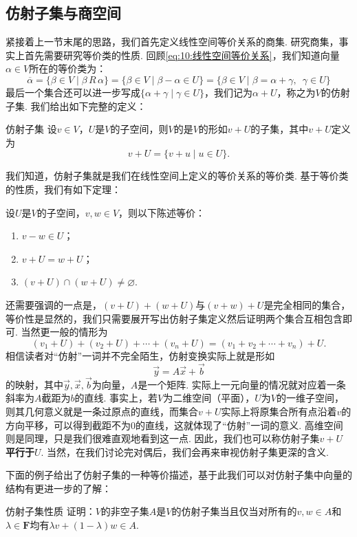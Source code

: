 \subsection{仿射子集与商空间}

紧接着上一节末尾的思路，我们首先定义线性空间等价关系的商集. 研究商集，事实上首先需要研究等价类的性质. 回顾\autoref{eq:10:线性空间等价关系}，我们知道向量$\alpha\in V$所在的等价类为：
\[\overline{\alpha}=\{\beta\in V \mid \beta\,R\,\alpha\}=\{\beta\in V \mid \beta-\alpha\in U\}=\{\beta\in V \mid \beta=\alpha+\gamma,\enspace\gamma\in U\}\]
最后一个集合还可以进一步写成$\{\alpha+\gamma \mid \gamma\in U\}$，我们记为$\alpha+U$，称之为$V$的仿射子集. 我们给出如下完整的定义：
\begin{definition}{仿射子集}{} 
    设$v\in V$，$U$是$V$的子空间，则$V$的是$V$的形如$v+U$的子集，其中$v+U$定义为
    \[v+U=\{v+u \mid u\in U\}.\]
\end{definition}
我们知道，仿射子集就是我们在线性空间上定义的等价关系的等价类. 基于等价类的性质，我们有如下定理：
\begin{theorem}{}{}
    设$U$是$V$的子空间，$v,w\in V$，则以下陈述等价：
    \begin{enumerate}
        \item $v-w\in U$；
        \item $v+U=w+U$；
        \item $(v+U)\cap(w+U)\neq \varnothing$.
    \end{enumerate}
\end{theorem}

还需要强调的一点是，$(v+U)+(w+U)$与$(v+w)+U$是完全相同的集合，等价性是显然的，我们只需要展开写出仿射子集定义然后证明两个集合互相包含即可. 当然更一般的情形为
\[(v_1+U)+(v_2+U)+\cdots+(v_n+U)=(v_1+v_2+\cdots+v_n)+U.\]
相信读者对``仿射''一词并不完全陌生，仿射变换实际上就是形如\[\vec{y}=A\vec{x}+\vec{b}\]的映射，其中$\vec{y},\vec{x},\vec{b}$为向量，$A$是一个矩阵. 实际上一元向量的情况就对应着一条斜率为$A$截距为$b$的直线. 事实上，若$V$为二维空间（平面），$U$为$V$的一维子空间，则其几何意义就是一条过原点的直线，而集合$v+U$实际上将原集合所有点沿着$v$的方向平移，可以得到截距不为0的直线，这就体现了``仿射''一词的意义. 高维空间则是同理，只是我们很难直观地看到这一点. 因此，我们也可以称仿射子集$v+U$\textbf{\heiti 平行于}$U$. 当然，在我们讨论完对偶后，我们会再来审视仿射子集更深的含义.

下面的例子给出了仿射子集的一种等价描述，基于此我们可以对仿射子集中向量的结构有更进一步的了解：
\begin{example}{}{仿射子集性质}
    证明：$V$的非空子集$A$是$V$的仿射子集当且仅当对所有的$v,w\in A$和$\lambda\in\mathbf{F}$均有$\lambda v+(1-\lambda)w\in A$.
\end{example}

